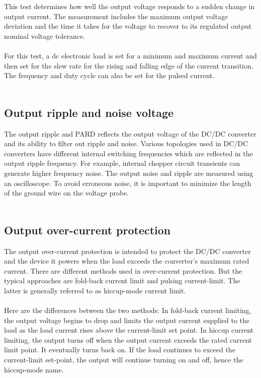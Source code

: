  This test determines how well the output voltage responds to a sudden change in output current. The measurement includes the maximum output voltage deviation and the time it takes for the voltage to recover to its regulated output nominal voltage tolerance.
\\ \\
For this test, a dc electronic load is set for a minimum and maximum current and then set for the slew rate for the rising and falling edge of the current transition. The frequency and duty cycle can also be set for the pulsed current.
\\ \\
\subsection{Output ripple and noise voltage} 

The output ripple and PARD reflects the output voltage of the DC/DC converter and its ability to filter out ripple and noise. Various topologies used in DC/DC converters have different internal switching frequencies which are reflected in the output ripple frequency. For example, internal chopper circuit transients can generate higher frequency noise. The output noise and ripple are measured using an oscilloscope. To avoid erroneous noise, it is important to minimize the length of the ground wire on the voltage probe.
\\ \\
\subsection{Output over-current protection}

The output over-current protection is intended to protect the DC/DC converter and the device it powers when the load exceeds the converter’s maximum rated current. There are different methods used in over-current protection. But the typical approaches are fold-back current limit and pulsing current-limit. The latter is generally referred to as hiccup-mode current limit.
\\ \\
Here are the differences between the two methods: In fold-back current limiting, the output voltage begins to drop and limits the output current supplied to the load as the load current rises above the current-limit set point. In hiccup current limiting, the output turns off when the output current exceeds the rated current limit point. It eventually turns back on. If the load continues to exceed the current-limit set-point, the output will continue turning on and off, hence the hiccup-mode name.
\\ \\
